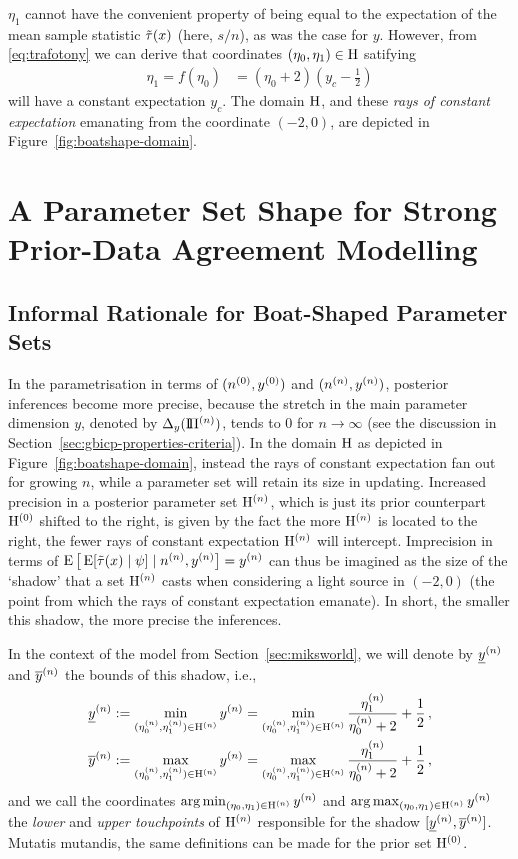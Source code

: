 $\eta_1$ cannot have the convenient property of being equal to
the expectation of the mean sample statistic $\tilde{\tau}(x)$ (here, $s/n$),
as was the case for $y$.
However, from \eqref{eq:trafotony} we can derive that coordinates $(\eta_0,\eta_1) \in \mathrm{H}$ satifying
\begin{align}
\label{eq:raysofconstantexpectation}
\eta_1 = f(\eta_0) &= (\eta_0 + 2)(y_c - \frac{1}{2}) 
\end{align}
will have a constant expectation $y_c$.
The domain $\mathrm{H}$, and these \emph{rays of constant expectation} emanating from the coordinate $(-2,0)$,
are depicted in Figure~\ref{fig:boatshape-domain}.


\section{A Parameter Set Shape for Strong Prior-Data Agreement Modelling}

\subsection{Informal Rationale for Boat-Shaped Parameter Sets}
\label{boatshape-rationale}

In the parametrisation in terms of $(n^{(0)},y^{(0)})$ and $(n^{(n)}, y^{(n)})$,
posterior inferences become more precise,
because the stretch in the main parameter dimension $y$, denoted by $\Delta_y(\text{I}\!\Pi^{(n)})$,
tends to $0$ for $n \to \infty$ (see the discussion in Section~\ref{sec:gbicp-properties-criteria}).
In the domain $\mathrm{H}$ as depicted in Figure~\ref{fig:boatshape-domain},
instead the rays of constant expectation fan out for growing $n$, %
while a parameter set will retain its size in updating.
Increased precision in a posterior parameter set $\mathrm{H}^{(n)}$, which is just
its prior counterpart $\mathrm{H}^{(0)}$ shifted to the right,
is given by the fact the more $\mathrm{H}^{(n)}$ is located to the right,
the fewer rays of constant expectation $\mathrm{H}^{(n)}$ will intercept.
Imprecision in terms of $\operatorname{E}\big[\operatorname{E}[\tilde{\tau}(x) \mid \psi] \mid n^{(n)}, y^{(n)}\big] = y^{(n)}$
can thus be imagined as the size of the `shadow' that a set $\mathrm{H}^{(n)}$ casts
when considering a light source in $(-2,0)$ (the point from which the rays of constant expectation emanate).
In short, the smaller this shadow, the more precise the inferences.

In the context of the model from Section~\ref{sec:miksworld},
we will denote by $\underline{y}^{(n)}$ and $\overline{y}^{(n)}$ the bounds of this shadow,
i.e.,
\begin{align*}
\underline{y}^{(n)} &:= \min_{(\eta_0^{(n)},\eta_1^{(n)}) \in \mathrm{H}^{(n)}} y^{(n)} = \min_{(\eta_0^{(n)},\eta_1^{(n)}) \in \mathrm{H}^{(n)}} \frac{\eta_1^{(n)}}{\eta_0^{(n)}+2} + \frac{1}{2}\,, \\
\overline{y}^{(n)} &:= \max_{(\eta_0^{(n)},\eta_1^{(n)}) \in \mathrm{H}^{(n)}} y^{(n)} = \max_{(\eta_0^{(n)},\eta_1^{(n)}) \in \mathrm{H}^{(n)}} \frac{\eta_1^{(n)}}{\eta_0^{(n)}+2} + \frac{1}{2}\,,
\end{align*}
and we call the coordinates $\arg\min_{(\eta_0,\eta_1) \in \mathrm{H}^{(n)}} y^{(n)}$ and $\arg\max_{(\eta_0,\eta_1) \in \mathrm{H}^{(n)}} y^{(n)}$
the \emph{lower} and \emph{upper touchpoints} of $\mathrm{H}^{(n)}$ responsible for the shadow $[\underline{y}^{(n)}, \overline{y}^{(n)}]$.
Mutatis mutandis, the same definitions can be made for the prior set $\mathrm{H}^{(0)}$.

